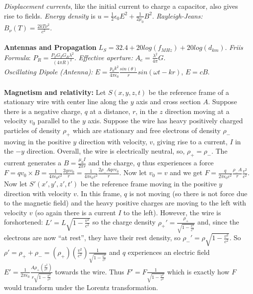 \emph{Displacement currents},
like the initial current to charge a capacitor, also gives rise to fields.  
\emph{Energy density} is
$u= {\frac 1 2} \epsilon_0 E^2 + {\frac 1 {2 \mu_0}} B^2$.
\emph{Rayleigh-Jeans:} $B_{\nu}(T)= {\frac {2kT \nu^2}{c^2}}$.
\\
\\
{\bf Antennas and Propagation}
$L_S = 32.4 + 20 log(f_{MHz}) + 20 log(d_{km})$.  \emph{Friis Formula}:
$P_R = {\frac {P_T G_T G_R \lambda^2} {(4 \pi R)^2}}$.  \emph{Effective aperture:} 
$A_e = {\frac {\lambda^2} {4 \pi}}G$.
\\
\emph{Oscillating Dipole (Antenna):}
$E= {\frac {p_0 k^2} {4 \pi \epsilon_0}}
{\frac {sin( \theta )} {r}} sin(\omega t - k r)$, $E=cB$.  
\\
\\
{\bf Magnetism and relativity:}  Let $S(x,y,z,t)$ be the reference frame of a stationary
wire with center line along the $y$ axis and cross section $A$.  Suppose there is a
negative charge, $q$ at a distance, $r$, in the $z$ direction moving at a velocity $v_0$ parallel to the $y$
axis. Suppose the wire has 
heavy positively charged particles of density $\rho_{+}$ which are stationary and
free electrons of density $\rho_{-}$ moving in the positive $y$ direction with velocity, 
$v$, giving rise to a current, $I$ in the
$-y$ direction.  Overall, the wire is electrically neutral, so, $\rho_{+}= \rho_{-}$.
The current generates a $B= {\frac {\mu_0 I} {2 \pi r}}$ and the charge, $q$ thus experiences a force
$F= q v_0 \times B
=  {\frac 1 {4 \pi \epsilon_0 c^2}} {\frac {2q v v_0} {r}}
=  {\frac 1 {4 \pi \epsilon_0 c^2}} {\frac {2 \rho_- A q v v_0} {r}}$.  Now let $v_0=v$ and we get
$F= {\frac q {2 \pi \epsilon_0 c^2}} {\frac {\rho_- A} {r}} {\frac {v^2}{c^2}}$. 
Now let $S'(x', y', z',t')$ be the reference frame moving in the positive $y$ direction with velocity $v$.  In
this frame, $q$ is not moving (so there is not force due to the magnetic field) and the heavy positive
charges are moving to the left with velocity $v$ (so again there is a current $I$ to the left).  However,
the wire is forshortened: $L'= L
{\sqrt {1- {\frac {v^2}{c^2}}}}$ so the charge density
$\rho_+ ' = {\frac {\rho_+ } {\sqrt {1- {\frac {v^2}{c^2}}}}}$ and, since the electrons are now ``at rest'', they
have their rest density, so
$\rho_- ' = \rho {\sqrt {1- {\frac {v^2}{c^2}}}}$.  So
$\rho'= \rho_+ + \rho_- = (\rho_+) ({\frac {v^2}{c^2}}) {\frac 1 
{\sqrt {1- {\frac {v^2}{c^2}}}}}$ and $q$ experiences an electric field 
$E'= {\frac 1 {2 \pi \epsilon_0}} {\frac {A \rho_+ ({\frac {v^2}{c^2}})}
{r {\sqrt {1- {\frac {v^2}{c^2}}}}}}$ towards the wire.  Thus $F'= F {\frac {1}
{\sqrt {1- {\frac {v^2}{c^2}}}} }$ which is exactly how $F$ would transform under the Lorentz transformation.
